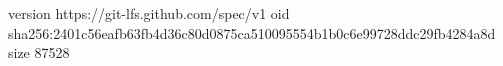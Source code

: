 version https://git-lfs.github.com/spec/v1
oid sha256:2401c56eafb63fb4d36c80d0875ca510095554b1b0c6e99728ddc29fb4284a8d
size 87528

